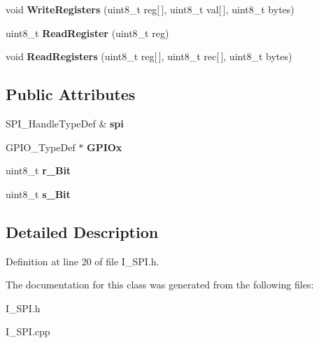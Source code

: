 \begin{DoxyCompactItemize}
void {\bfseries Write\+Registers} (uint8\+\_\+t reg\mbox{[}$\,$\mbox{]}, uint8\+\_\+t val\mbox{[}$\,$\mbox{]}, uint8\+\_\+t bytes)
\item 
\mbox{\label{classInterface_1_1I__SPI_a11106cef4e7614c65b88c1f885d38e96}} 
uint8\+\_\+t {\bfseries Read\+Register} (uint8\+\_\+t reg)
\item 
\mbox{\label{classInterface_1_1I__SPI_ac2ffd8435e629f8d12a4287da9728b2e}} 
void {\bfseries Read\+Registers} (uint8\+\_\+t reg\mbox{[}$\,$\mbox{]}, uint8\+\_\+t rec\mbox{[}$\,$\mbox{]}, uint8\+\_\+t bytes)
\end{DoxyCompactItemize}
\subsection*{Public Attributes}
\begin{DoxyCompactItemize}
\item 
\mbox{\label{classInterface_1_1I__SPI_a0be454a2782b5ecbcc6e08a20a8a28e9}} 
S\+P\+I\+\_\+\+Handle\+Type\+Def \& {\bfseries spi}
\item 
\mbox{\label{classInterface_1_1I__SPI_ae85ceec2c946c77fa97124b2274dbcb0}} 
G\+P\+I\+O\+\_\+\+Type\+Def $\ast$ {\bfseries G\+P\+I\+Ox}
\item 
\mbox{\label{classInterface_1_1I__SPI_abfa0f664f69477085b19599bf195e636}} 
uint8\+\_\+t {\bfseries r\+\_\+\+Bit}
\item 
\mbox{\label{classInterface_1_1I__SPI_ac574d7e0b257cee5afc6b951774bff60}} 
uint8\+\_\+t {\bfseries s\+\_\+\+Bit}
\end{DoxyCompactItemize}


\subsection{Detailed Description}


Definition at line 20 of file I\+\_\+\+S\+P\+I.\+h.



The documentation for this class was generated from the following files\+:\begin{DoxyCompactItemize}
\item 
I\+\_\+\+S\+P\+I.\+h\item 
I\+\_\+\+S\+P\+I.\+cpp\end{DoxyCompactItemize}
